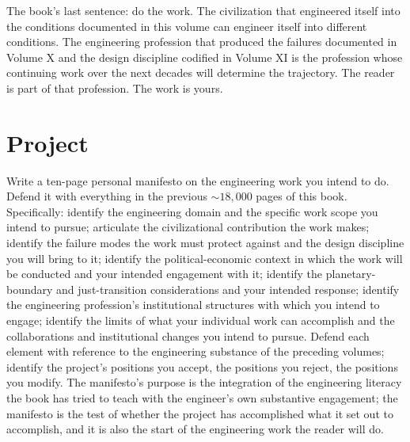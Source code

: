 The book's last sentence: do the work. The civilization that engineered itself into the conditions documented in this volume can engineer itself into different conditions. The engineering profession that produced the failures documented in Volume X and the design discipline codified in Volume XI is the profession whose continuing work over the next decades will determine the trajectory. The reader is part of that profession. The work is yours.

\section{Project}

\begin{project}
Write a ten-page personal manifesto on the engineering work you intend to do. Defend it with everything in the previous $\sim 18{,}000$ pages of this book. Specifically: identify the engineering domain and the specific work scope you intend to pursue; articulate the civilizational contribution the work makes; identify the failure modes the work must protect against and the design discipline you will bring to it; identify the political-economic context in which the work will be conducted and your intended engagement with it; identify the planetary-boundary and just-transition considerations and your intended response; identify the engineering profession's institutional structures with which you intend to engage; identify the limits of what your individual work can accomplish and the collaborations and institutional changes you intend to pursue. Defend each element with reference to the engineering substance of the preceding volumes; identify the project's positions you accept, the positions you reject, the positions you modify. The manifesto's purpose is the integration of the engineering literacy the book has tried to teach with the engineer's own substantive engagement; the manifesto is the test of whether the project has accomplished what it set out to accomplish, and it is also the start of the engineering work the reader will do.
\end{project}
